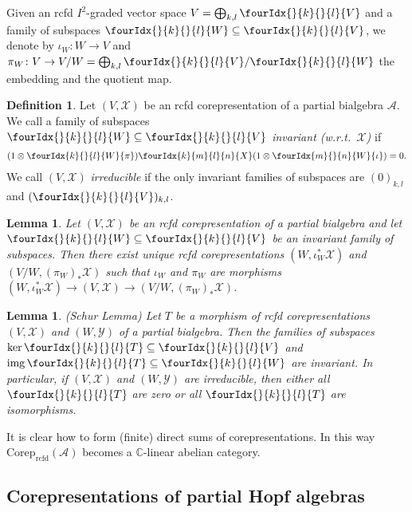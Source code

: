 \documentclass[10pt]{article}
\DeclareMathOperator{\img}{img}
\DeclareMathOperator{\rcf}{\mathrm{rcfd}}
\newcommand{\Corep}{\mathrm{Corep}}
\newcommand{\C}{\mathbb{C}}
\newcommand{\Vectrcf}{\Gr{\mathrm{Vect}}{I}{I}{}{\rcf}}
\newcommand{\Gr}[5]{\fourIdx{#2}{#4}{#3}{#5}{#1}}%
\newcommand{\Gru}[3]{\Gr{#1}{}{}{#2}{#3}}
\newtheorem{Lem}[Theorem]{Lemma}
\theoremstyle{definition}
\newtheorem{Def}[Theorem]{Definition}
\numberwithin{equation}{section}
\begin{document}
Given an rcfd $I^{2}$-graded vector space $V=\bigoplus_{k,l} \Gru{V}{k}{l}$
and a family of subspaces $\Gru{W}{k}{l} \subseteq \Gru{V}{k}{l}$, we
denote by $\iota_{W}\colon W\to V$ and $\pi_{W} \colon V \to
V/W=\bigoplus_{k,l} \Gru{V}{k}{l}/\Gru{W}{k}{l}$ the embedding and the
quotient map.


\begin{Def} Let $(V,\mathscr{X})$ be an rcfd
  corepresentation of a partial bialgebra $\mathscr{A}$.  We call a
  family of subspaces $\Gru{W}{k}{l} \subseteq \Gru{V}{k}{l}$
  \emph{invariant (w.r.t.\ $\mathscr{X}$)} if
 \begin{align} \label{eq:rep-invariant} (1\otimes
   \Gr{\pi}{k}{l}{}{W})\Gr{X}{k}{l}{m}{n}(1 \otimes
   \Gr{\iota}{m}{n}{}{W}) =0.
  \end{align}
We call $(V,\mathscr{X})$ 
 \emph{irreducible} if the only invariant families of subspaces are
 $(0)_{k,l}$ and $(\Gru{V}{k}{l})_{k,l}$.
\end{Def}

\begin{Lem}
  Let $(V,\mathscr{X})$ be an rcfd corepresentation
  of a partial bialgebra and let $\Gru{W}{k}{l}
  \subseteq \Gru{V}{k}{l}$ be an invariant family of subspaces. Then
  there exist unique rcfd corepresentations
  $(W,\iota_{W}^{*}\mathscr{X})$ and $(V/W,(\pi_{W})_{*}\mathscr{X})$ 
  such that $\iota_{W}$  and  $\pi_{W}$  are  morphisms  $(W,\iota_{W}^{*}\mathscr{X}) \to (V,\mathscr{X}) \to (V/W,(\pi_{W})_{*}\mathscr{X})$.
\end{Lem}

\begin{Lem} (Schur Lemma) Let $T$ be a morphism of rcfd
  corepresentations $(V,\mathscr{X})$ and $(W,\mathscr{Y})$ of a
  partial bialgebra. Then the families of subspaces $\ker
  \Gru{T}{k}{l} \subseteq \Gru{V}{k}{l}$ and $\img\Gru{T}{k}{l}
  \subseteq \Gru{W}{k}{l}$ are invariant.  In particular, if
  $(V,\mathscr{X})$ and $(W,\mathscr{Y})$ are irreducible, then either
  all $\Gru{T}{k}{l}$ are zero or all $\Gru{T}{k}{l}$ are
  isomorphisms.
\end{Lem} 

It is clear how to form (finite) direct sums of corepresentations. In this way $\Corep_{\rcf}(\mathscr{A})$
  becomes a $\C$-linear abelian category. 


\subsection{Corepresentations of partial Hopf algebras}
\end{document}
